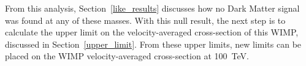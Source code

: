   From this analysis, Section~\ref{like_results} discusses how no Dark Matter signal was found at any of these masses.
  With this null result, the next step is to calculate the upper limit on the velocity-averaged cross-section of this WIMP, discussed in Section~\ref{upper_limit}.
  From these upper limits, new limits can be placed on the WIMP velocity-averaged cross-section at \SI{100}{TeV}.


